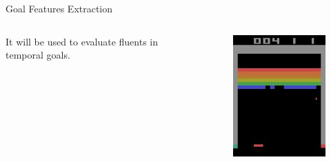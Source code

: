 \begin{frame}{Goal Features Extraction}
\begin{columns}[c,onlytextwidth]
{                It will be used to evaluate fluents in temporal goals.
            }
            \begin{figure}
                \includegraphics[width=\textwidth]{images/robotfeaturesextractorsequence/robotfeatures-original-image.jpg}
            \end{figure}
    \end{columns}
\end{frame}

